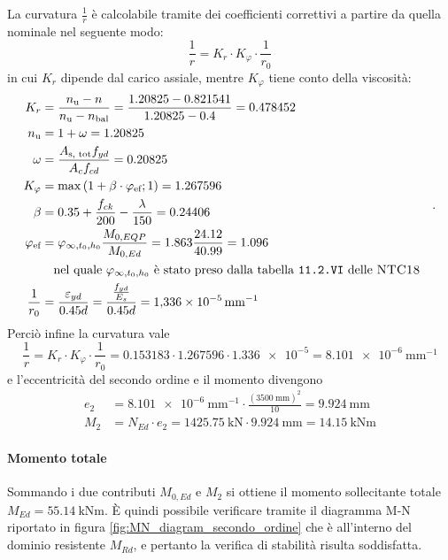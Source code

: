La curvatura $\frac{1}{r}$ è calcolabile tramite dei coefficienti correttivi a partire da quella nominale nel seguente modo:
\begin{equation}
    \frac{1}{r} = K_r \cdot K_\varphi \cdot \frac{1}{r_0}
\end{equation}
in cui $K_r$ dipende dal carico assiale, mentre $K_\varphi$ tiene conto della viscosità:
\[
\begin{split}
    K_r &= \frac{n_\textup{u} - n}{n_\textup{u} - n_\textup{bal}} = \frac{1.20825 - 0.821541}{1.20825 - 0.4} = 0.478452\\
    n_\textup{u} &= 1 + \omega = 1.20825 \\
    \omega &= \frac{A_\textup{s, tot} f_{yd}}{A_c f_{cd}} = 0.20825 \\
    K_\varphi &= \max \left(1 + \beta \cdot \varphi_\textup{ef}; 1 \right) = 1.267596	 \\
    \beta &= 0.35 + \frac{f_{ck}}{200} - \frac{\lambda}{150} = 0.24406 \\
    \varphi_\textup{ef} &= \varphi_{\infty, t_0, h_0} \frac{M_{0,EQP}}{M_{0,Ed}}= 1.863 \frac{24.12}{40.99} = 1.096 \\
        &\quad \text{nel quale $\varphi_{\infty, t_0, h_0}$ è stato preso dalla tabella \normaref{11.2.VI} delle \norma{NTC18}} \\
    \frac{1}{r_0} &= \frac{\varepsilon_{yd}}{0.45 d} = \frac{\frac{f_{yd}}{E_s}}{0.45 d} = \SI{1.336e-5}{\milli\metre\tothe{-1}}
\end{split}
\quad .
\] 
Perciò infine la curvatura vale 
\[
    \frac{1}{r} = K_r \cdot K_\varphi \cdot \frac{1}{r_0} = 0.153183 \cdot 1.267596	 \cdot \num{1.336e-5} = \SI{8.101e-6}{\milli\metre\tothe{-1}}
\]
e l'eccentricità del secondo ordine e il momento divengono
\begin{equation}
    \begin{split}
        e_2 &=\SI{8.101e-6}{\milli\metre\tothe{-1}} \cdot \frac{(\SI{3500}{\milli\metre})^2}{10} = \SI{9.924}{\milli\metre} \\
        M_2 &=  N_{Ed}\cdot e_2  = \SI{1425.75}{\kilo\newton} \cdot \SI{9.924}{\milli\metre} = \SI{14.15}{\kilo\newton\metre} 
    \end{split}
\end{equation}

\paragraph{Momento totale}
Sommando  i due contributi $M_{0,Ed}$ e $M_2$ si ottiene il momento sollecitante totale  $M_{Ed} = \SI{55.14}{\kilo\newton\metre}$.
È quindi possibile verificare tramite il diagramma M-N riportato in figura \ref{fig:MN_diagram_secondo_ordine} che è all'interno del dominio resistente $M_{Rd}$, e pertanto la verifica di stabilità risulta soddisfatta.

